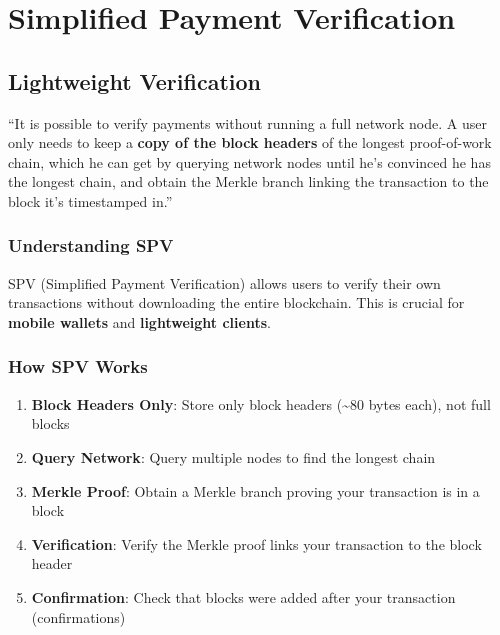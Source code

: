 
\section{Simplified Payment Verification}
\label{sec:spv}

\subsection{Lightweight Verification}
\label{subsec:lightweight-verification}

``It is possible to verify payments without running a full network node. A user only needs to keep a \textbf{copy of the block headers} of the longest proof-of-work chain, which he can get by querying network nodes until he's convinced he has the longest chain, and obtain the Merkle branch linking the transaction to the block it's timestamped in.''

\subsubsection{Understanding SPV}

SPV (Simplified Payment Verification) allows users to verify their own transactions without downloading the entire blockchain. This is crucial for \textbf{mobile wallets} and \textbf{lightweight clients}.

\subsubsection{How SPV Works}

\begin{enumerate}
  \item \textbf{Block Headers Only}: Store only block headers (\textasciitilde80 bytes each), not full blocks
  \item \textbf{Query Network}: Query multiple nodes to find the longest chain
  \item \textbf{Merkle Proof}: Obtain a Merkle branch proving your transaction is in a block
  \item \textbf{Verification}: Verify the Merkle proof links your transaction to the block header
  \item \textbf{Confirmation}: Check that blocks were added after your transaction (confirmations)
\end{enumerate}

